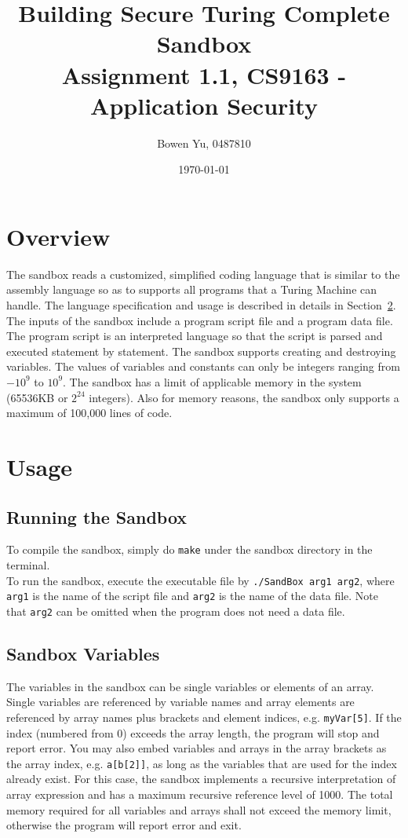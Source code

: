 \documentclass[11pt]{article}
\title{\bf Building Secure Turing Complete Sandbox\\[2ex] 
       \rm\Large Assignment 1.1, CS9163 - Application Security}
\author{Bowen Yu, 0487810}
\date{\today}
\begin{document}
\maketitle
\large

\section{Overview}
The sandbox reads a customized, simplified coding language that is similar to the assembly language so as to supports all programs that a Turing Machine can handle. The language specification and usage is described in details in Section~\ref{sec:usage}. The inputs of the sandbox include a program script file and a program data file. The program script is an interpreted language so that the script is parsed and executed statement by statement. The sandbox supports creating and destroying variables. The values of variables and constants can only be integers ranging from $-10^{9}$ to $10^{9}$. The sandbox has a limit of applicable memory in the system (65536KB or $2^{24}$ integers). Also for memory reasons, the sandbox only supports a maximum of 100,000 lines of code.

\section{Usage}
\label{sec:usage}
\subsection{Running the Sandbox}
To compile the sandbox, simply do {\tt make} under the sandbox directory in the terminal.\\
To run the sandbox, execute the executable file by {\tt ./SandBox arg1 arg2}, where {\tt arg1} is the name of the script file and {\tt arg2} is the name of the data file. Note that {\tt arg2} can be omitted when the program does not need a data file.\\

\subsection{Sandbox Variables}
The variables in the sandbox can be single variables or elements of an array. Single variables are referenced by variable names and array elements are referenced by array names plus brackets and element indices, e.g. {\tt myVar[5]}. If the index (numbered from 0) exceeds the array length, the program will stop and report error. You may also embed variables and arrays in the array brackets as the array index, e.g. {\tt a[b[2]]}, as long as the variables that are used for the index already exist. For this case, the sandbox implements a recursive interpretation of array expression and has a maximum recursive reference level of 1000. The total memory required for all variables and arrays shall not exceed the memory limit, otherwise the program will report error and exit.
\end{document}
